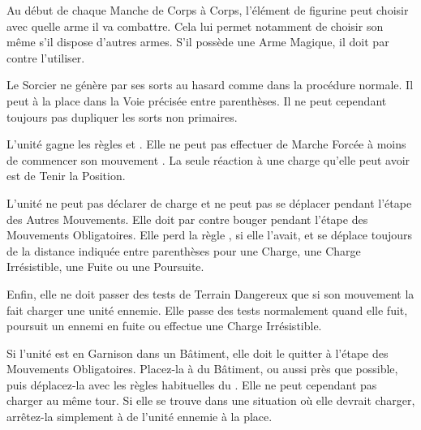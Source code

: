 
Au début de chaque Manche de Corps à Corps, l'élément de figurine peut choisir avec quelle arme il va combattre. Cela lui permet notamment de choisir son \hw{} même s'il dispose d'autres armes. S'il possède une Arme Magique, il doit par contre l'utiliser.


Le Sorcier ne génère par ses sorts au hasard comme dans la procédure normale. Il peut à la place  dans la Voie précisée entre parenthèses. Il ne peut cependant toujours pas dupliquer les sorts non primaires.


L'unité gagne les règles \immunetopsychology{} et \unstable{}. Elle ne peut pas effectuer de Marche Forcée à moins de commencer son mouvement . La seule réaction à une charge qu'elle peut avoir est de Tenir la Position.

\newpage
{}

L'unité ne peut pas déclarer de charge et ne peut pas se déplacer pendant l'étape des Autres Mouvements. Elle doit par contre bouger pendant l'étape des Mouvements Obligatoires. Elle perd la règle \swiftstride{}, si elle l'avait, et se déplace toujours de la distance indiquée entre parenthèses pour une Charge, une Charge Irrésistible, une Fuite ou une Poursuite.

 Enfin, elle ne doit passer des tests de Terrain Dangereux que si son mouvement la fait charger une unité ennemie. Elle passe des tests normalement quand elle fuit, poursuit un ennemi en fuite ou effectue une Charge Irrésistible.

Si l'unité est en Garnison dans un Bâtiment, elle doit le quitter à l'étape des Mouvements Obligatoires. Placez-la à  du Bâtiment, ou aussi près que possible, puis déplacez-la avec les règles habituelles du \randommovement{}. Elle ne peut cependant pas charger au même tour. Si elle se trouve dans une situation où elle devrait charger, arrêtez-la simplement à  de l'unité ennemie à la place.


